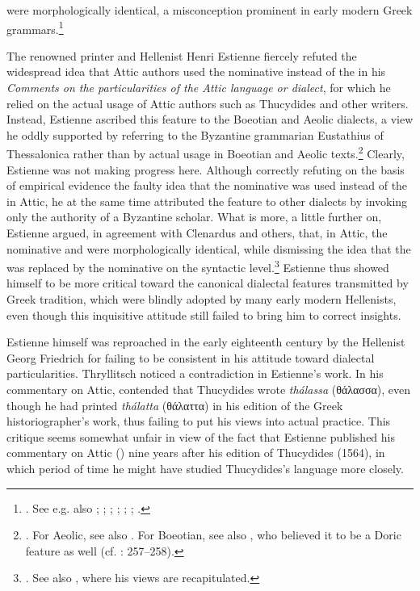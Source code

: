  were morphologically identical, a misconception prominent in early modern Greek grammars.\footnote{\citet[7 (misprint for 6)]{Clenardus1530}. See e.g. also \citet[534]{Crusius1558}; \citet[12\textsc{\textsuperscript{r}}]{Baile1588}; \citet[11, 37]{Walper1589}; \citet[32, 34]{Gretser1593}; \citet[53, 453]{Lancelot1655}; \citet[101]{Giraudeau1739}; \citet[20]{Facius1782}.}

The renowned printer and Hellenist Henri Estienne fiercely refuted the widespread idea that Attic authors used the nominative instead of the  in his \textit{Comments on the particularities of the Attic language or dialect}, for which he relied on the actual usage of Attic authors such as Thucydides and other writers. Instead, Estienne ascribed this feature to the Boeotian and Aeolic dialects, a view he oddly supported by referring to the Byzantine grammarian Eustathius of Thessalonica rather than by actual usage in Boeotian and Aeolic texts.\footnote{\citet[15]{Estienne1573}. For Aeolic, see also \citet[{\scriptsize{)(}}.4\textsc{\textsuperscript{v}}]{Schmidt1604}. For Boeotian, see also \citet[71]{Merigon1621}, who believed it to be a Doric feature as well (cf. \citealt{Maittaire1706}: 257–258).} Clearly, Estienne was not making progress here. Although correctly refuting on the basis of empirical evidence the faulty idea that the nominative was used instead of the  in Attic, he at the same time attributed the feature to other dialects by invoking only the authority of a Byzantine scholar. What is more, a little further on, Estienne argued, in agreement with Clenardus and others, that, in Attic, the nominative and  were morphologically identical, while dismissing the idea that the  was replaced by the nominative on the syntactic level.\footnote{\citet[17]{Estienne1573}. See also \citet[29, 42–43, 150]{Estienne1573}, where his views are recapitulated.} Estienne thus showed himself to be more critical toward the canonical dialectal features transmitted by Greek tradition, which were blindly adopted by many early modern Hellenists, even though this inquisitive attitude still failed to bring him to correct insights.

Estienne himself was reproached in the early eighteenth century by the Hellenist Georg Friedrich \citet[d.3\textsuperscript{v}]{Thryllitsch1709} for failing to be consistent in his attitude toward dialectal particularities. Thryllitsch noticed a contradiction in Estienne’s work. In his commentary on Attic, \citet[13]{Estienne1573} contended that Thucydides wrote \textit{thálassa} (θάλασσα), even though he had printed \textit{thálatta} (θάλαττα) in his edition of the Greek historiographer’s work, thus failing to put his views into actual practice. This critique seems somewhat unfair in view of the fact that Estienne published his commentary on Attic (\citeyear{Estienne1573}) nine years after his edition of Thucydides (1564), in which period of time he might have studied Thucydides’s language more closely.

